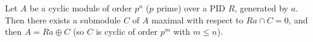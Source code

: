 Let $A$ be a cyclic module of order $p^n$ ($p$ prime) over a PID $R$, generated by $a$. Then there exists a submodule $C$ of $A$ maximal with respect to $Ra \cap C = 0$, and then $A = Ra \oplus C$ (so $C$ is cyclic of order $p^m$ with $m \leq n$).
